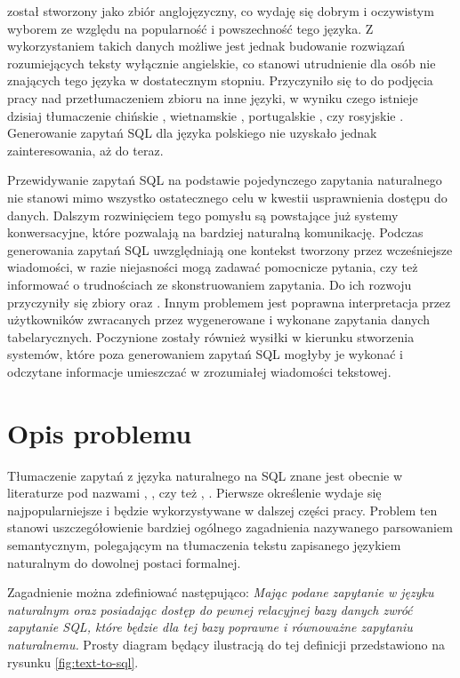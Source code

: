  został stworzony jako zbiór anglojęzyczny, co wydaję się dobrym i oczywistym wyborem ze względu na popularność i powszechność tego języka. Z wykorzystaniem takich danych możliwe jest jednak budowanie rozwiązań rozumiejących teksty wyłącznie angielskie, co stanowi utrudnienie dla osób nie znających tego języka w dostatecznym stopniu. Przyczyniło się to do podjęcia pracy nad przetłumaczeniem zbioru  na inne języki, w wyniku czego istnieje dzisiaj tłumaczenie chińskie \cite{Min2019}, wietnamskie \cite{Nguyen2020}, portugalskie \cite{SpiderPortuguese}, czy rosyjskie \cite{Bakshandaeva2022}. Generowanie zapytań SQL dla języka polskiego nie uzyskało jednak zainteresowania, aż do teraz.

Przewidywanie zapytań SQL na podstawie pojedynczego zapytania naturalnego nie stanowi mimo wszystko ostatecznego celu w kwestii usprawnienia dostępu do danych. Dalszym rozwinięciem tego pomysłu są powstające już systemy konwersacyjne, które pozwalają na bardziej naturalną komunikację. Podczas generowania zapytań SQL uwzględniają one kontekst tworzony przez wcześniejsze wiadomości, w razie niejasności mogą zadawać pomocnicze pytania, czy też informować o trudnościach ze skonstruowaniem zapytania. Do ich rozwoju przyczyniły się zbiory  \cite{sparc} oraz  \cite{cosql}. Innym problemem jest poprawna interpretacja przez użytkowników zwracanych przez wygenerowane i wykonane zapytania danych tabelarycznych. Poczynione zostały również wysiłki w kierunku stworzenia systemów, które poza generowaniem zapytań SQL mogłyby je wykonać i odczytane informacje umieszczać w zrozumiałej wiadomości tekstowej.



\section{Opis problemu}
Tłumaczenie zapytań z języka naturalnego na SQL znane jest obecnie w literaturze pod nazwami , , czy też , . Pierwsze określenie wydaje się najpopularniejsze i będzie wykorzystywane w dalszej części pracy. Problem ten stanowi uszczegółowienie bardziej ogólnego zagadnienia nazywanego parsowaniem semantycznym, polegającym na tłumaczenia tekstu zapisanego językiem naturalnym do dowolnej postaci formalnej.

Zagadnienie  można zdefiniować następująco: \textit{Mając podane zapytanie w języku naturalnym oraz posiadając dostęp do pewnej relacyjnej bazy danych zwróć zapytanie SQL, które będzie dla tej bazy poprawne i równoważne zapytaniu naturalnemu.} Prosty diagram będący ilustracją do tej definicji przedstawiono na rysunku \ref{fig:text-to-sql}. 


